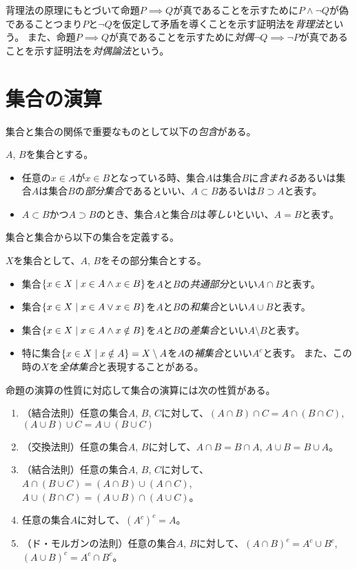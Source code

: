 背理法の原理にもとづいて命題$P \implies Q$が真であることを示すために$P \land \neg Q$が偽であることつまり$P$と$\neg Q$を仮定して矛盾を導くことを示す証明法を\emph{背理法}という。
また、命題$P \implies Q$が真であることを示すために\emph{対偶}$\neg Q \implies \neg P$が真であることを示す証明法を\emph{対偶論法}という。

\section{集合の演算}

集合と集合の関係で重要なものとして以下の\emph{包含}がある。

\begin{definition}[集合の包含]
$A$, $B$を集合とする。
\begin{itemize}
\item
任意の$x \in A$が$x \in B$となっている時、集合$A$は集合$B$に\emph{含まれる}あるいは集合$A$は集合$B$の\emph{部分集合}であるといい、$A \subset B$あるいは$B \supset A$と表す。
\item
$A \subset B$かつ$A \supset B$のとき、集合$A$と集合$B$は\emph{等しい}といい、$A = B$と表す。
\end{itemize}
\end{definition}

集合と集合から以下の集合を定義する。

\begin{definition}[集合の演算]
$X$を集合として、$A$, $B$をその部分集合とする。
\begin{itemize}
\item
集合$\{ x \in X \mid x \in A \land x \in B \}$を$A$と$B$の\emph{共通部分}といい$A\cap B$と表す。
\item
集合$\{ x \in X \mid x \in A \lor x \in B \}$を$A$と$B$の\emph{和集合}といい$A\cup B$と表す。
\item
集合$\{ x \in X \mid x \in A \land x \notin B \}$を$A$と$B$の\emph{差集合}といい$A\setminus B$と表す。
\item
特に集合$\{ x \in X \mid x \notin A \} = X\setminus A$を$A$の\emph{補集合}といい$A^c$と表す。
また、この時の$X$を\emph{全体集合}と表現することがある。
\end{itemize}
\end{definition}

命題の演算の性質に対応して集合の演算には次の性質がある。
\begin{enumerate}
\item
（結合法則）任意の集合$A$, $B$, $C$に対して、$(A\cap B)\cap C = A\cap (B\cap C)$, $(A\cup B)\cup C = A\cup (B\cup C)$
\item
（交換法則）任意の集合$A$, $B$に対して、$A\cap B = B\cap A$, $A\cup B = B\cup A$。
\item
（結合法則）任意の集合$A$, $B$, $C$に対して、$A\cap(B\cup C) = (A\cap B)\cup(A\cap C)$, $A\cup(B\cap C) = (A\cup B)\cap(A\cup C)$。
\item
任意の集合$A$に対して、$(A^c)^c = A$。
\item
（ド・モルガンの法則）任意の集合$A$, $B$に対して、$(A\cap B)^c = A^c\cup B^c$, $(A\cup B)^c = A^c\cap B^c$。
\end{enumerate}

